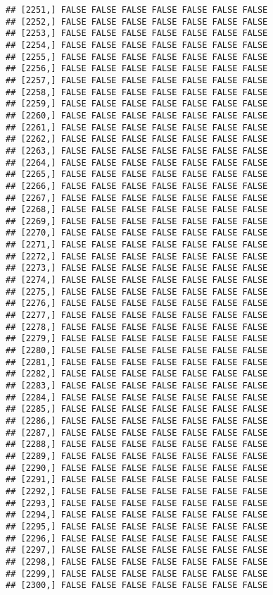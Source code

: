 \documentclass[
]{article}
\begin{document}
\begin{verbatim}
## [2251,] FALSE FALSE FALSE FALSE FALSE FALSE FALSE
## [2252,] FALSE FALSE FALSE FALSE FALSE FALSE FALSE
## [2253,] FALSE FALSE FALSE FALSE FALSE FALSE FALSE
## [2254,] FALSE FALSE FALSE FALSE FALSE FALSE FALSE
## [2255,] FALSE FALSE FALSE FALSE FALSE FALSE FALSE
## [2256,] FALSE FALSE FALSE FALSE FALSE FALSE FALSE
## [2257,] FALSE FALSE FALSE FALSE FALSE FALSE FALSE
## [2258,] FALSE FALSE FALSE FALSE FALSE FALSE FALSE
## [2259,] FALSE FALSE FALSE FALSE FALSE FALSE FALSE
## [2260,] FALSE FALSE FALSE FALSE FALSE FALSE FALSE
## [2261,] FALSE FALSE FALSE FALSE FALSE FALSE FALSE
## [2262,] FALSE FALSE FALSE FALSE FALSE FALSE FALSE
## [2263,] FALSE FALSE FALSE FALSE FALSE FALSE FALSE
## [2264,] FALSE FALSE FALSE FALSE FALSE FALSE FALSE
## [2265,] FALSE FALSE FALSE FALSE FALSE FALSE FALSE
## [2266,] FALSE FALSE FALSE FALSE FALSE FALSE FALSE
## [2267,] FALSE FALSE FALSE FALSE FALSE FALSE FALSE
## [2268,] FALSE FALSE FALSE FALSE FALSE FALSE FALSE
## [2269,] FALSE FALSE FALSE FALSE FALSE FALSE FALSE
## [2270,] FALSE FALSE FALSE FALSE FALSE FALSE FALSE
## [2271,] FALSE FALSE FALSE FALSE FALSE FALSE FALSE
## [2272,] FALSE FALSE FALSE FALSE FALSE FALSE FALSE
## [2273,] FALSE FALSE FALSE FALSE FALSE FALSE FALSE
## [2274,] FALSE FALSE FALSE FALSE FALSE FALSE FALSE
## [2275,] FALSE FALSE FALSE FALSE FALSE FALSE FALSE
## [2276,] FALSE FALSE FALSE FALSE FALSE FALSE FALSE
## [2277,] FALSE FALSE FALSE FALSE FALSE FALSE FALSE
## [2278,] FALSE FALSE FALSE FALSE FALSE FALSE FALSE
## [2279,] FALSE FALSE FALSE FALSE FALSE FALSE FALSE
## [2280,] FALSE FALSE FALSE FALSE FALSE FALSE FALSE
## [2281,] FALSE FALSE FALSE FALSE FALSE FALSE FALSE
## [2282,] FALSE FALSE FALSE FALSE FALSE FALSE FALSE
## [2283,] FALSE FALSE FALSE FALSE FALSE FALSE FALSE
## [2284,] FALSE FALSE FALSE FALSE FALSE FALSE FALSE
## [2285,] FALSE FALSE FALSE FALSE FALSE FALSE FALSE
## [2286,] FALSE FALSE FALSE FALSE FALSE FALSE FALSE
## [2287,] FALSE FALSE FALSE FALSE FALSE FALSE FALSE
## [2288,] FALSE FALSE FALSE FALSE FALSE FALSE FALSE
## [2289,] FALSE FALSE FALSE FALSE FALSE FALSE FALSE
## [2290,] FALSE FALSE FALSE FALSE FALSE FALSE FALSE
## [2291,] FALSE FALSE FALSE FALSE FALSE FALSE FALSE
## [2292,] FALSE FALSE FALSE FALSE FALSE FALSE FALSE
## [2293,] FALSE FALSE FALSE FALSE FALSE FALSE FALSE
## [2294,] FALSE FALSE FALSE FALSE FALSE FALSE FALSE
## [2295,] FALSE FALSE FALSE FALSE FALSE FALSE FALSE
## [2296,] FALSE FALSE FALSE FALSE FALSE FALSE FALSE
## [2297,] FALSE FALSE FALSE FALSE FALSE FALSE FALSE
## [2298,] FALSE FALSE FALSE FALSE FALSE FALSE FALSE
## [2299,] FALSE FALSE FALSE FALSE FALSE FALSE FALSE
## [2300,] FALSE FALSE FALSE FALSE FALSE FALSE FALSE

\end{verbatim}
\end{document}

